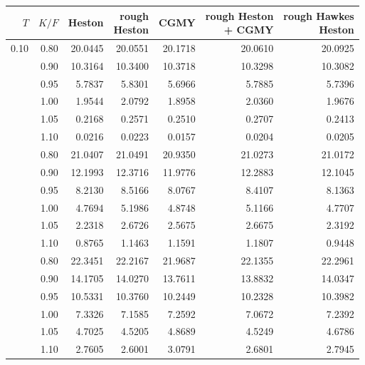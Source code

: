 \begin{tabular}{rrrrrrr}
\toprule
$T$ & $K/F$ & Heston & \shortstack[r]{rough\\Heston} & CGMY & \shortstack[r]{rough Heston\\+ CGMY} & \shortstack[r]{rough Hawkes\\Heston}\\
\midrule
0.10 & 0.80 & 20.0445 & 20.0551 & 20.1718 & 20.0610 & 20.0925\\
 & 0.90 & 10.3164 & 10.3400 & 10.3718 & 10.3298 & 10.3082\\
 & 0.95 & 5.7837 & 5.8301 & 5.6966 & 5.7885 & 5.7396\\
 & 1.00 & 1.9544 & 2.0792 & 1.8958 & 2.0360 & 1.9676\\
 & 1.05 & 0.2168 & 0.2571 & 0.2510 & 0.2707 & 0.2413\\
 & 1.10 & 0.0216 & 0.0223 & 0.0157 & 0.0204 & 0.0205\\
\addlinespace
0.50 & 0.80 & 21.0407 & 21.0491 & 20.9350 & 21.0273 & 21.0172\\
 & 0.90 & 12.1993 & 12.3716 & 11.9776 & 12.2883 & 12.1045\\
 & 0.95 & 8.2130 & 8.5166 & 8.0767 & 8.4107 & 8.1363\\
 & 1.00 & 4.7694 & 5.1986 & 4.8748 & 5.1166 & 4.7707\\
 & 1.05 & 2.2318 & 2.6726 & 2.5675 & 2.6675 & 2.3192\\
 & 1.10 & 0.8765 & 1.1463 & 1.1591 & 1.1807 & 0.9448\\
\addlinespace
1.00 & 0.80 & 22.3451 & 22.2167 & 21.9687 & 22.1355 & 22.2961\\
 & 0.90 & 14.1705 & 14.0270 & 13.7611 & 13.8832 & 14.0347\\
 & 0.95 & 10.5331 & 10.3760 & 10.2449 & 10.2328 & 10.3982\\
 & 1.00 & 7.3326 & 7.1585 & 7.2592 & 7.0672 & 7.2392\\
 & 1.05 & 4.7025 & 4.5205 & 4.8689 & 4.5249 & 4.6786\\
 & 1.10 & 2.7605 & 2.6001 & 3.0791 & 2.6801 & 2.7945\\
\bottomrule
\end{tabular}
